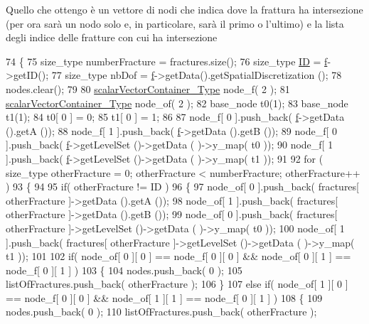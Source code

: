 Quello che ottengo è un vettore di nodi che indica dove la frattura ha intersezione (per ora sarà un nodo solo e, in particolare, sarà il primo o l'ultimo) e la lista degli indice delle fratture con cui ha intersezione 
\begin{DoxyCode}
74 \{
75     size\_type numberFracture = fractures.size();
76     size\_type \hyperlink{namespaceLifeV_a7c0e64679fcd30daa5471b87a57601e9}{ID} = \hyperlink{god__e_8m_a68f477f9b30a6300d5af9b02eac82f35}{f}->getID();
77     size\_type nbDof = \hyperlink{god__e_8m_a68f477f9b30a6300d5af9b02eac82f35}{f}->getData().getSpatialDiscretization ();
78     nodes.clear();
79 
80     \hyperlink{Core_8h_ae3afecb4de4310d8262e9ab20cfb875b}{scalarVectorContainer\_Type} node\_f( 2 );
81     \hyperlink{Core_8h_ae3afecb4de4310d8262e9ab20cfb875b}{scalarVectorContainer\_Type} node\_of( 2 );
82     base\_node t0(1);
83     base\_node t1(1);
84     t0[ 0 ] = 0;
85     t1[ 0 ] = 1;
86 
87     node\_f[ 0 ].push\_back( \hyperlink{god__e_8m_a68f477f9b30a6300d5af9b02eac82f35}{f}->getData ().getA ());
88     node\_f[ 1 ].push\_back( \hyperlink{god__e_8m_a68f477f9b30a6300d5af9b02eac82f35}{f}->getData ().getB ());
89     node\_f[ 0 ].push\_back( \hyperlink{god__e_8m_a68f477f9b30a6300d5af9b02eac82f35}{f}->getLevelSet ()->getData ( )->y\_map( t0 ));
90     node\_f[ 1 ].push\_back( \hyperlink{god__e_8m_a68f477f9b30a6300d5af9b02eac82f35}{f}->getLevelSet ()->getData ( )->y\_map( t1 ));
91 
92     \textcolor{keywordflow}{for} ( size\_type otherFracture = 0; otherFracture < numberFracture; otherFracture++ )
93     \{
94 
95         \textcolor{keywordflow}{if}( otherFracture != ID )
96         \{
97             node\_of[ 0 ].push\_back( fractures[ otherFracture ]->getData ().getA ());
98             node\_of[ 1 ].push\_back( fractures[ otherFracture ]->getData ().getB ());
99             node\_of[ 0 ].push\_back( fractures[ otherFracture ]->getLevelSet ()->getData ( )->y\_map( t0 ));
100             node\_of[ 1 ].push\_back( fractures[ otherFracture ]->getLevelSet ()->getData ( )->y\_map( t1 ));
101 
102             \textcolor{keywordflow}{if}( node\_of[ 0 ][ 0 ] == node\_f[ 0 ][ 0 ] && node\_of[ 0 ][ 1 ] == node\_f[ 0 ][ 1 ] )
103             \{
104                 nodes.push\_back( 0 );
105                 listOfFractures.push\_back( otherFracture );
106             \}
107             \textcolor{keywordflow}{else} \textcolor{keywordflow}{if}( node\_of[ 1 ][ 0 ] == node\_f[ 0 ][ 0 ] && node\_of[ 1 ][ 1 ] == node\_f[ 0 ][ 1 ] )
108             \{
109                 nodes.push\_back( 0 );
110                 listOfFractures.push\_back( otherFracture );

\end{DoxyCode}
